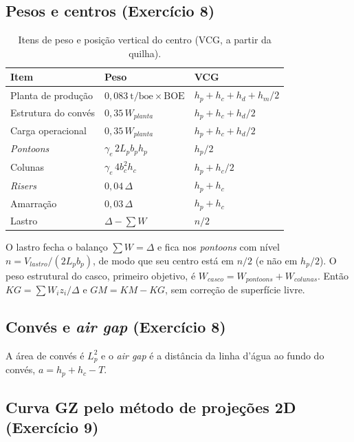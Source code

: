 \documentclass[11pt,a4paper]{article}
\begin{document}
\subsection{Pesos e centros (Exercício 8)}

\begin{table}[H]
\centering
\caption{Itens de peso e posição vertical do centro (VCG, a partir da quilha).}\label{tab:itenspeso}
\begin{tabular}{lll}
\toprule
Item & Peso & VCG \\
\midrule
Planta de produção & $0{,}083~\text{t/boe} \times \text{BOE}$ & $h_p + h_c + h_d + h_m/2$ \\
Estrutura do convés & $0{,}35\, W_{planta}$ & $h_p + h_c + h_d/2$ \\
Carga operacional & $0{,}35\, W_{planta}$ & $h_p + h_c + h_d/2$ \\
\emph{Pontoons} & $\gamma_e \, 2 L_p b_p h_p$ & $h_p/2$ \\
Colunas & $\gamma_e \, 4 b_c^2 h_c$ & $h_p + h_c/2$ \\
\emph{Risers} & $0{,}04\, \Delta$ & $h_p + h_c$ \\
Amarração & $0{,}03\, \Delta$ & $h_p + h_c$ \\
Lastro & $\Delta - \sum W$ & $n/2$ \\
\bottomrule
\end{tabular}
\end{table}

O lastro fecha o balanço $\sum W = \Delta$ e fica nos \emph{pontoons} com nível
$n = V_{lastro}/(2 L_p b_p)$, de modo que seu centro está em $n/2$ (e não em $h_p/2$). O peso
estrutural do casco, primeiro objetivo, é $W_{casco} = W_{pontoons} + W_{colunas}$. Então
$KG = \sum W_i z_i / \Delta$ e $GM = KM - KG$, sem correção de superfície livre.

\subsection{Convés e \emph{air gap} (Exercício 8)}

A área de convés é $L_p^2$ e o \emph{air gap} é a distância da linha d'água ao fundo do convés,
$a = h_p + h_c - T$.

\subsection{Curva GZ pelo método de projeções 2D (Exercício 9)}
\end{document}
